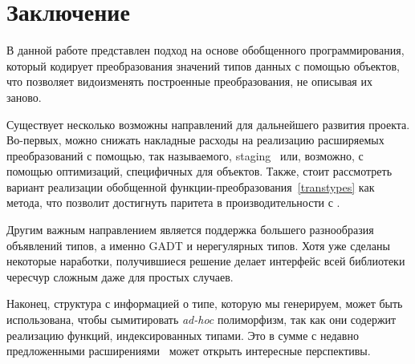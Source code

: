 \section{Заключение}
\label{sec:futurework}

В данной работе представлен подход на основе обобщенного программирования, который кодирует преобразования значений типов данных с помощью объектов, что позволяет видоизменять построенные преобразования, не описывая их заново.

Существует несколько возможны направлений для дальнейшего развития проекта. Во-первых, можно снижать накладные расходы на реализацию расширяемых преобразований 
с помощью, так называемого, staging~\cite{Staged} или, возможно, с помощью оптимизаций, специфичных для объектов. 
Также, стоит рассмотреть вариант реализации обобщенной функции-преобразования~\ref{transtypes} как метода, что позволит достигнуть паритета в производительности с \Visitors{}.

Другим важным направлением является поддержка большего разнообразия объявлений типов, а именно GADT и нерегулярных типов. Хотя уже сделаны некоторые наработки, получившиеся решение делает интерфейс всей библиотеки чересчур сложным даже для простых случаев.

Наконец, структура с информацией о типе, которую мы генерируем, может быть использована, чтобы сымитировать \emph{ad-hoc} полиморфизм, так как они содержит реализацию функций, индексированных типами. Это в сумме с недавно предложенными расширениями~\cite{ModularImplicits} может открыть интересные перспективы.

